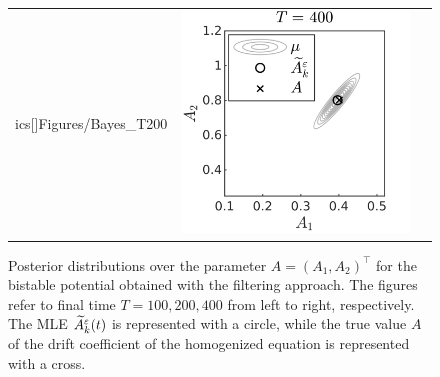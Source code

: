 \documentclass[10pt]{article}
\begin{document}
\begin{figure}[t]
\begin{tabular}{ccc}
ics[]{Figures/Bayes_T200}  & \includegraphics[]{Figures/Bayes_T400} \\
	\end{tabular}
	\caption{Posterior distributions over the parameter $A = (A_1, A_2)^\top$ for the bistable potential obtained with the filtering approach. The figures refer to final time $T = 100, 200, 400$ from left to right, respectively. The MLE $\widetilde A^\varepsilon_k(t)$ is represented with a circle, while the true value $A$ of the drift coefficient of the homogenized equation is represented with a cross.}
	\label{fig:Bayes}
\end{figure}
\end{document}
